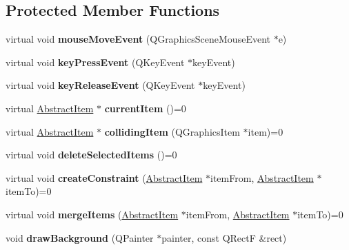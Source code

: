 \subsection*{Protected Member Functions}
\begin{DoxyCompactItemize}
\item 
\hypertarget{class_abstract_scene_a85a7291b6a4b9d68e7522e5355e1015b}{virtual void {\bfseries mouse\-Move\-Event} (Q\-Graphics\-Scene\-Mouse\-Event $\ast$e)}\label{class_abstract_scene_a85a7291b6a4b9d68e7522e5355e1015b}

\item 
\hypertarget{class_abstract_scene_a3884a2794ef2ecea9e025a43b2930fbb}{virtual void {\bfseries key\-Press\-Event} (Q\-Key\-Event $\ast$key\-Event)}\label{class_abstract_scene_a3884a2794ef2ecea9e025a43b2930fbb}

\item 
\hypertarget{class_abstract_scene_a595a21766aa6befa42c20ee29316aa0d}{virtual void {\bfseries key\-Release\-Event} (Q\-Key\-Event $\ast$key\-Event)}\label{class_abstract_scene_a595a21766aa6befa42c20ee29316aa0d}

\item 
\hypertarget{class_abstract_scene_ab0e1c9b55ca57f372e6a7b4844585e54}{virtual \hyperlink{class_abstract_item}{Abstract\-Item} $\ast$ {\bfseries current\-Item} ()=0}\label{class_abstract_scene_ab0e1c9b55ca57f372e6a7b4844585e54}

\item 
\hypertarget{class_abstract_scene_a7cb777668dfcf7af16bafb14e8aca4ea}{virtual \hyperlink{class_abstract_item}{Abstract\-Item} $\ast$ {\bfseries colliding\-Item} (Q\-Graphics\-Item $\ast$item)=0}\label{class_abstract_scene_a7cb777668dfcf7af16bafb14e8aca4ea}

\item 
\hypertarget{class_abstract_scene_a95090b3c222a23a177bc9335b1018c9f}{virtual void {\bfseries delete\-Selected\-Items} ()=0}\label{class_abstract_scene_a95090b3c222a23a177bc9335b1018c9f}

\item 
\hypertarget{class_abstract_scene_ab9c3472ec3a66c6747956855ae5d35ee}{virtual void {\bfseries create\-Constraint} (\hyperlink{class_abstract_item}{Abstract\-Item} $\ast$item\-From, \hyperlink{class_abstract_item}{Abstract\-Item} $\ast$item\-To)=0}\label{class_abstract_scene_ab9c3472ec3a66c6747956855ae5d35ee}

\item 
\hypertarget{class_abstract_scene_a9058506b73949d944ef32811bca139f3}{virtual void {\bfseries merge\-Items} (\hyperlink{class_abstract_item}{Abstract\-Item} $\ast$item\-From, \hyperlink{class_abstract_item}{Abstract\-Item} $\ast$item\-To)=0}\label{class_abstract_scene_a9058506b73949d944ef32811bca139f3}

\item 
\hypertarget{class_abstract_scene_aecfb53fda76c7678be6a0f847424a4b0}{void {\bfseries draw\-Background} (Q\-Painter $\ast$painter, const Q\-Rect\-F \&rect)}\label{class_abstract_scene_aecfb53fda76c7678be6a0f847424a4b0}

\end{DoxyCompactItemize}
